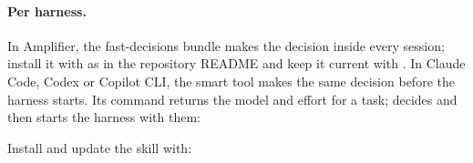\paragraph{Per harness.} In Amplifier, the fast-decisions bundle makes the decision inside every session; install it
with  as in the repository README and keep it current with .
In Claude Code, Codex or Copilot CLI, the smart tool makes the same decision before the harness starts. Its
 command returns the model and effort for a task;  decides and then starts the harness with
them:
\begin{center}\small
{}\qquad {}
\end{center}
Install and update the skill with:
\begin{center}\small
{}\\
\end{center}
